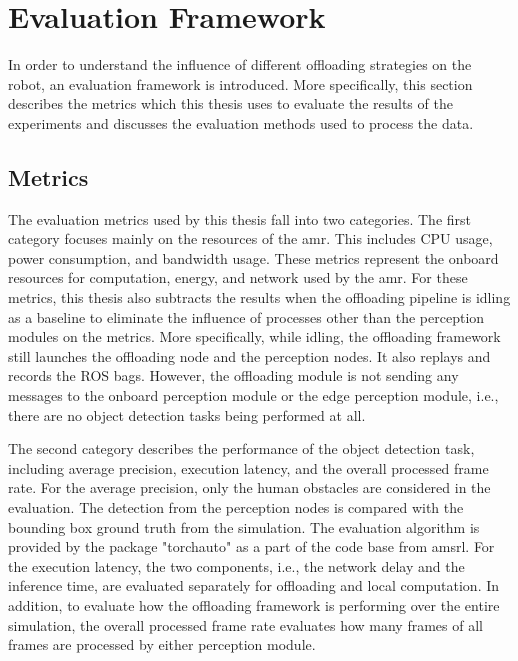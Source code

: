 \section{Evaluation Framework}\label{sec:evaluation_framework}

In order to understand the influence of different offloading strategies on the robot, an evaluation framework is introduced. More specifically, this section describes the metrics which this thesis uses to evaluate the results of the experiments and discusses the evaluation methods used to process the data. 

\subsection{Metrics}
 

The evaluation metrics used by this thesis fall into two categories. The first category focuses mainly on the resources of the \gls{amr}. This includes CPU usage, power consumption, and bandwidth usage. These metrics represent the onboard resources for computation, energy, and network used by the \gls{amr}. For these metrics, this thesis also subtracts the results when the offloading pipeline is idling as a baseline to eliminate the influence of processes other than the perception modules on the metrics. More specifically, while idling, the offloading framework still launches the offloading node and the perception nodes. It also replays and records the ROS bags. However, the offloading module is not sending any messages to the onboard perception module or the edge perception module, i.e., there are no object detection tasks being performed at all. 

The second category describes the performance of the object detection task, including average precision, execution latency, and the overall processed frame rate. For the average precision, only the human obstacles are considered in the evaluation. The detection from the perception nodes is compared with the bounding box ground truth from the simulation. The evaluation algorithm is provided by the package "torchauto" as a part of the code base from \gls{amsrl}.  For the execution latency, the two components, i.e., the network delay and the inference time, are evaluated separately for offloading and local computation. In addition, to evaluate how the offloading framework is performing over the entire simulation, the overall processed frame rate evaluates how many frames of all frames are processed by either perception module.

